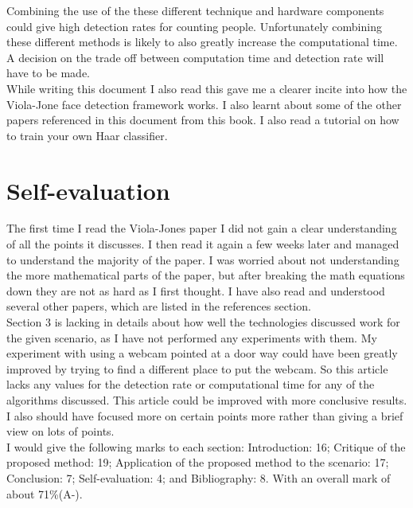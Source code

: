 \documentclass[10pt,a4paper,openbib]{article}
\begin{document}
\begin{multicols}{2}
\noindent Combining the use of the these different technique and hardware components could give high detection rates for counting people. Unfortunately combining these different methods is likely to also greatly increase the computational time. A decision on the trade off between computation time and detection rate will have to be made. \\

\noindent While writing this document I also read \cite[655-684]{book} this gave me a clearer incite into how the Viola-Jone face detection framework works. I also learnt about some of the other papers referenced in this document from this book\cite[655-684]{book}. I also read a tutorial on how to train your own Haar classifier\cite{banana}.

\section{Self-evaluation}
The first time I read the Viola-Jones paper\cite{violaJones} I did not gain a clear understanding of all the points it discusses. I then read it again a few weeks later and managed to understand the majority of the paper. I was worried about not understanding the more mathematical parts of the paper, but after breaking the math equations down they are not as hard as I first thought. I have also read and understood several other papers, which are listed in the references section. \\

\noindent Section 3 is lacking in details about how well the technologies discussed work for the given scenario, as I have not performed any experiments with them. My experiment with using a webcam pointed at a door way could have been greatly improved by trying to find a different place to put the webcam. So this article lacks any values for the detection rate or computational time for any of the algorithms discussed. This article could be improved with more conclusive results. I also should have focused more on certain points more rather than giving a brief view on lots of points. \\

\noindent I would give the following marks to each section: Introduction: 16; Critique of the proposed method: 19; Application of the proposed method to the scenario: 17; Conclusion: 7; Self-evaluation: 4; and  Bibliography: 8. With an overall mark of about 71\%(A-).  
\end{multicols}



\end{document}
